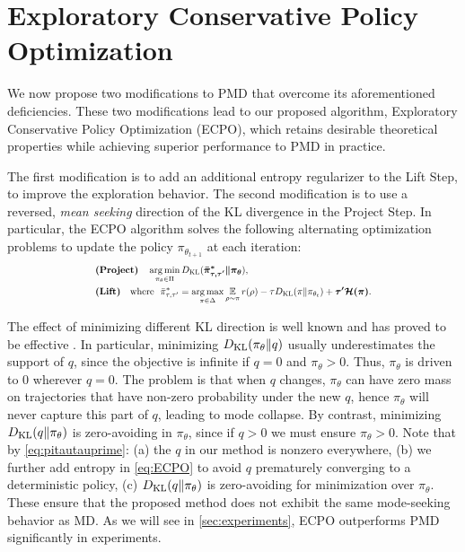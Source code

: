 

\section{Exploratory Conservative Policy Optimization}
\label{subsec:ECPO}

We now propose two modifications to PMD that overcome 
its aforementioned deficiencies.
These two modifications lead to our proposed algorithm,
Exploratory Conservative Policy Optimization (ECPO),
which retains desirable theoretical properties while achieving superior performance to PMD in practice.

The first modification is to add an additional entropy regularizer
to the Lift Step,
to improve the exploration behavior. %
The second modification is to use a reversed, \emph{mean seeking} direction
of the KL divergence in the Project Step.
In particular, the ECPO algorithm solves the following 
alternating
optimization problems to update the policy $\pi_{\theta_{t+1}}$
at each iteration:
%
\begin{equation}
\scalemath{0.75}{
\label{eq:ECPO}
\begin{split}
&\text{\bf (Project)} \quad  \argmin\limits_{\pi_\theta \in \Pi}{\KL(\bm{ \bar{\pi}_{\tau,\tau^{\prime}}^* \| \pi_\theta }) }, \\
&\text{\bf (Lift)} \quad \text{where}\ \ \bar{\pi}_{\tau,\tau^{\prime}}^*  =  \argmax\limits_{\pi \in \Delta}{ \ep\limits_{\rho \sim \pi}{  r(\rho) }  - \tau \KL(\pi \| \pi_{\theta_t}) + \bm{\tau^{\prime} \cH(\pi)} }.
\end{split}
}
\end{equation}

The effect of minimizing different KL direction is
well known \citep{kevin2012machine} and has proved
to be effective \citep{norouzi2016reward,nachum2017improving}.
In particular, minimizing $D_{\mathrm{KL}}(\pi_{\theta}\|q)$
usually underestimates the support of $q$,
since the objective is infinite if $q = 0$ and $\pi_{\theta} > 0$.
Thus, $\pi_\theta$ is driven to $0$ wherever $q=0$.
The problem is that when $q$ changes, $\pi_\theta$ can have zero mass
on trajectories that have non-zero probability under the new $q$,
hence $\pi_\theta$ will never capture this part of $q$,
leading to mode collapse.
By contrast, minimizing $D_{\mathrm{KL}}(q\|\pi_{\theta})$ 
is zero-avoiding in $\pi_{\theta}$,
since if $q > 0$ we must ensure $\pi_{\theta} > 0$.
Note that by \cref{eq:pitautauprime}:
(a) the $q$ in our method is nonzero everywhere,
(b) we further add entropy in \cref{eq:ECPO} to avoid $q$ prematurely converging
to a deterministic policy, 
(c) $D_{\mathrm{KL}}(q\|\pi_{\theta})$ is zero-avoiding for minimization over
$\pi_{\theta}$.
These ensure that the proposed method does not exhibit the same mode-seeking 
behavior as MD.
As we will see in \cref{sec:experiments},
ECPO outperforms PMD significantly in experiments.


